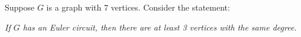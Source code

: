 \documentclass[10pt]{exam}
\def\imp{\rightarrow}
\begin{document}
\begin{questions}
\begin{parts}
\end{parts}


% 
% 








\question[6] Suppose $G$ is a graph with 7 vertices.  Consider the statement:

\centerline{\textit{If $G$ has an Euler circuit, then there are at least 3 vertices with the same degree.}}

\end{questions}
\end{document}
